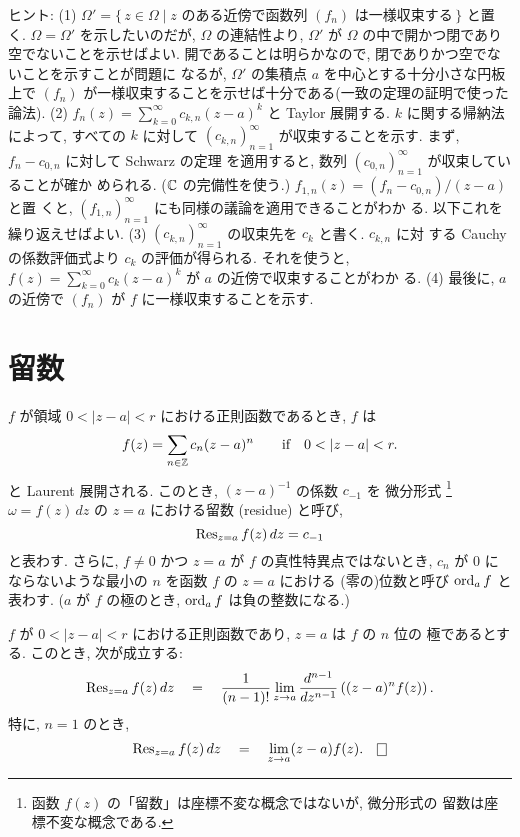 \documentclass[12pt,twoside]{jarticle}
\begin{document}
\noindent ヒント: (1) %
\(
  \Omega'=
  \{\, z \in \Omega \mid 
       \text{$z$ のある近傍で函数列 $(f_n)$ は一様収束する}\,\}
\)%
と置く. $\Omega = \Omega'$ を示したいのだが, $\Omega$ の連結性より,
$\Omega'$ が $\Omega$ の中で開かつ閉であり空でないことを示せばよい.
開であることは明らかなので, 閉でありかつ空でないことを示すことが問題に
なるが, $\Omega'$ の集積点 $a$ を中心とする十分小さな円板上で $(f_n)$ 
が一様収束することを示せば十分である(一致の定理の証明で使った論法). %
(2) $f_n(z)=\sum_{k=0}^{\infty}c_{k,n}(z-a)^k$ と Taylor 展開する. $k$ 
に関する帰納法によって, すべての $k$ に対して $(c_{k,n})_{n=1}^{\infty}$ 
が収束することを示す. まず, $f_n - c_{0,n}$ に対して Schwarz の定理
を適用すると, 数列 $(c_{0,n})_{n=1}^{\infty}$ が収束していることが確か
められる. (${\mathbb C}$ の完備性を使う.) $f_{1,n}(z)=(f_n-c_{0,n})/(z-a)$ と置
くと, $(f_{1,n})_{n=1}^{\infty}$ にも同様の議論を適用できることがわか
る. 以下これを繰り返えせばよい. %
(3) $(c_{k,n})_{n=1}^{\infty}$ の収束先を $c_k$ と書く. $c_{k,n}$ に対
する Cauchy の係数評価式より $c_k$ の評価が得られる. それを使うと, 
$f(z)=\sum_{k=0}^{\infty}c_k(z-a)^k$ が $a$ の近傍で収束することがわか
る. %
(4) 最後に, $a$ の近傍で $(f_n)$ が $f$ に一様収束することを示す.



\section{留数}

$f$ が領域 $0<|z-a|<r$ における正則函数であるとき, $f$ は
\[%
  f(z) = \sum_{n\in\Z} c_n (z - a)^n
  \qquad\text{if}\quad
  0 < |z -a| < r.
\]%
と Laurent 展開される. このとき, $(z - a)^{-1}$ の係数 $c_{-1}$ を %
微分形式%
\footnote{函数 $f(z)$ の「留数」は座標不変な概念ではないが, 微分形式の
  留数は座標不変な概念である.} %
$\omega = f(z)\,dz$ の $z = a$ における留数 (residue) と呼び,
\[%
  \Res_{z=a}f(z)\,dz = c_{-1}
\]%
と表わす. さらに, $f\ne0$ かつ $z=a$ が $f$ の真性特異点ではないとき,
$c_n$ が $0$ にならないような最小の $n$ を函数 $f$ の $z=a$ における
(零の)位数と呼び $\mathop{\mathrm{ord}}\nolimits_a f$ と表わす. %
($a$ が $f$ の極のとき, $\mathop{\mathrm{ord}}\nolimits_a f$ は負の整数になる.)

\begin{question}[留数の計算の仕方]
  $f$ が $0<|z-a|<r$ における正則函数であり, $z=a$ は $f$ の $n$ 位の
  極であるとする. このとき, 次が成立する:
  \[
    \mathop{\mathrm{Res}}\nolimits_{z=a}f(z)\,dz
    \quad = \quad
    \frac{1}{(n-1)!}
    \lim_{z\to a}
    \frac{d^{n-1}}{dz^{n-1}}\left( (z-a)^n f(z) \right).
 \]
  特に, $n=1$ のとき,
  \[
    \Res_{z=a}f(z)\,dz
    \quad = \quad
    \lim_{z\to a} (z-a)f(z).
    \qed
  \]
\end{question}
\end{document}
